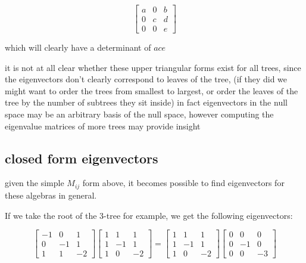 \documentclass{report}
\begin{document}
\begin{equation*}
\left[ \begin{matrix}
a & 0 & b\\
0 & c & d\\
0 & 0 & e
\end{matrix} \right]
\end{equation*}

which will clearly have a determinant of $ace$

it is not at all clear whether these upper triangular forms exist for all
trees, since the eigenvectors don't clearly correspond to leaves of the tree,
(if they did we might want to order the trees from smallest to largest, or
order the leaves of the tree by the number of subtrees they sit inside)
in fact eigenvectors in the null space may be an arbitrary basis of the null
space, however computing the eigenvalue matrices of more trees may provide
insight



\subsection{closed form eigenvectors}

given the simple $M_{ij}$ form above, it becomes possible to find eigenvectors for
these algebras in general.

If we take the root of the 3-tree for example, we get the following
eigenvectors:

\begin{equation*}
\left[\begin{matrix}
	-1 & 0 & 1\\
	0 & -1 & 1\\
	1 & 1 & -2
\end{matrix}\right]
\left[\begin{matrix}
	1 & 1 & 1\\
	1 & -1 & 1\\
	1 & 0 & -2
\end{matrix}\right]
=
\left[\begin{matrix}
	1 & 1 & 1\\
	1 & -1 & 1\\
	1 & 0 & -2
\end{matrix}\right]
\left[\begin{matrix}
	0 & 0 & 0\\
	0 & -1 & 0\\
	0 & 0 & -3
\end{matrix}\right]
\end{equation*}
\end{document}
